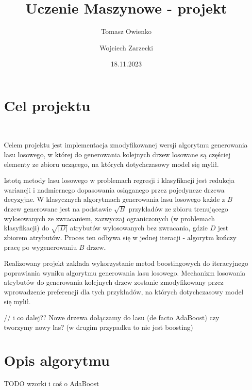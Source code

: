 \documentclass[10pt,a4paper]{article}
\title{Uczenie Maszynowe - projekt}
\author{Tomasz Owienko \and Wojciech Zarzecki}
\date{18.11.2023}
\begin{document}
	\maketitle
	
	
	
	\lstset{basicstyle=\small,style=code}


\section{Cel projektu}\

Celem projektu jest implementacja zmodyfikowanej wersji algorytmu generowania lasu losowego, w której do generowania kolejnych drzew losowane są częściej elementy ze zbioru uczącego, na których dotychczasowy model się mylił.


Istotą metody lasu losowego w problemach regresji i klasyfikacji jest redukcja wariancji i nadmiernego dopasowania osiąganego przez pojedyncze drzewa decyzyjne. W klasycznych algorytmach generowania lasu losowego każde z $B$ drzew generowane jest na podstawie $\sqrt{B}$ przykładów ze zbioru trenującego wylosowanych ze zwracaniem, zazwyczaj ograniczonych (w problemach klasyfikacji) do $\sqrt{|D|}$ atrybutów wylosowanych bez zwracania, gdzie $D$ jest zbiorem atrybutów. Proces ten odbywa się w jednej iteracji - algorytm kończy pracę po wygenerowaniu $B$ drzew. 

Realizowany projekt zakłada wykorzystanie metod boostingowych do iteracyjnego poprawiania wyniku algorytmu generowania lasu losowego. Mechanizm losowania atrybutów do generowania kolejnych drzew zostanie zmodyfikowany przez wprowadzenie preferencji dla tych przykładów, na których dotychczasowy model się mylił.

// i co dalej?? Nowe drzewa dołączamy do lasu (de facto AdaBoost) czy tworzymy nowy las? (w drugim przypadku to nie jest boosting)

\section{Opis algorytmu}

TODO wzorki i coś o AdaBoost
\end{document}
